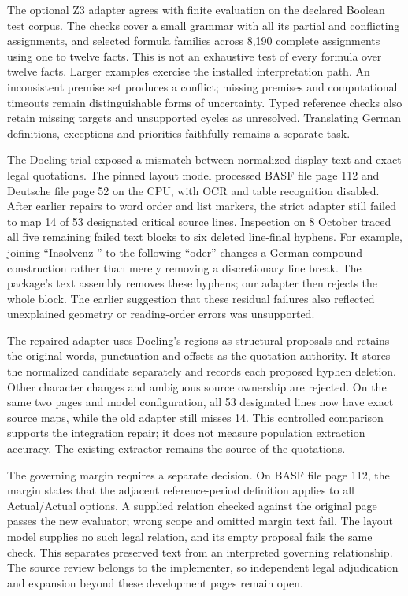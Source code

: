 \begingroup
{}
The optional Z3 adapter agrees with finite evaluation on the declared Boolean
test corpus. The checks cover a small grammar with all its partial and conflicting
assignments, and selected formula families across 8,190 complete assignments
using one to twelve facts. This is not an exhaustive test of every formula over
twelve facts. Larger examples exercise the installed interpretation path. An
inconsistent premise set produces a conflict; missing premises and computational
timeouts remain distinguishable forms of uncertainty. Typed reference checks
also retain missing targets and unsupported cycles as unresolved. Translating
German definitions, exceptions and priorities faithfully remains a separate task.
\par\endgroup

The Docling trial exposed a mismatch between normalized display text and exact
legal quotations. The pinned layout model processed BASF file page 112 and
Deutsche file page 52 on the CPU, with OCR and table recognition disabled.
After earlier repairs to word order and list markers, the strict adapter still
failed to map 14 of 53 designated critical source lines. Inspection on 8 October
traced all five remaining failed text blocks to six deleted line-final hyphens.
For example, joining ``Insolvenz-'' to the following ``oder'' changes a German
compound construction rather than merely removing a discretionary line break.
The package's text assembly removes these hyphens; our adapter then rejects the
whole block. The earlier suggestion that these residual failures also reflected
unexplained geometry or reading-order errors was unsupported.

The repaired adapter uses Docling's regions as structural proposals and retains
the original words, punctuation and offsets as the quotation authority. It stores
the normalized candidate separately and records each proposed hyphen deletion.
Other character changes and ambiguous source ownership are rejected. On the
same two pages and model configuration, all 53 designated lines now have exact
source maps, while the old adapter still misses 14. This controlled comparison
supports the integration repair; it does not measure population extraction
accuracy. The existing extractor remains the source of the quotations.

The governing margin requires a separate decision. On BASF file page 112, the
margin states that the adjacent reference-period definition applies to all
Actual/Actual options. A supplied relation checked against the original page
passes the new evaluator; wrong scope and omitted margin text fail. The layout
model supplies no such legal relation, and its empty proposal fails the same
check. This separates preserved text from an interpreted governing relationship.
The source review belongs to the implementer, so independent legal adjudication
and expansion beyond these development pages remain open.

